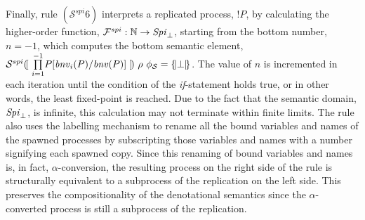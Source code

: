 \documentclass[10pt,a4paper,final,oneside,fleqn]{book}
\begin{document}
Finally, rule $(\mathcal{S}^{spi}6)$ interprets a replicated process, $!P$, by calculating the higher-order function, $\mathcal{F}^{spi}:\mathbb{N}\to\mbox{{\itshape Spi\/}}_\bot$, starting from the bottom number, $n=-1$, which computes the bottom semantic element, $\mathcal{S}^{spi}(\![~\underset{i=1}{\overset{-1}{\prod}}P[\mbox{{\itshape bnv\/}}_i(P)/\mbox{{\itshape bnv\/}}(P)]~]\!)~\rho~\phi_\mathcal{S}=\{\!|\bot|\!\}$. The value of $n$ is incremented in each iteration until the condition of the {\itshape if\/}-statement holds true, or in other words, the least fixed-point is reached. Due to the fact that the semantic domain, $\mbox{{\itshape Spi\/}}_\bot$, is infinite, this calculation may not terminate within finite limits.  The rule also uses the labelling mechanism to rename all the bound variables and names of the spawned processes by subscripting those variables and names with a number signifying each spawned copy. Since this renaming of bound variables and names is, in fact, $\alpha$-conversion, the resulting process on the right side of the rule is structurally equivalent to a subprocess of the replication on the left side. This preserves the compositionality of the denotational semantics since the $\alpha$-converted process is still a subprocess of the replication.
\end{document}
